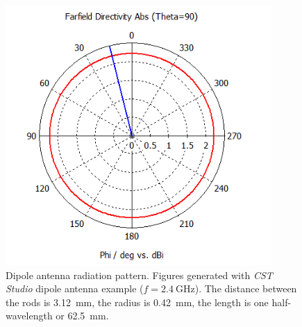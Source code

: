 \begin{figure}[H]
\begin{minipage}{0.45\textwidth}
        \includegraphics[width=0.9\textwidth]{figures/farfield (f=2.4) dipole_1.png} %
    \end{minipage}
    \caption{Dipole antenna radiation pattern. Figures generated with \textit{CST Studio} dipole antenna example ($f=\SI{2.4}{\giga\hertz}$). The distance between the rods is \SI{3.12}{\milli\meter}, the radius is \SI{0.42}{\milli\meter}, the length is one half-wavelength or \SI{62.5}{\milli\meter}.}
    \label{fig:dipole_1}
\end{figure}

